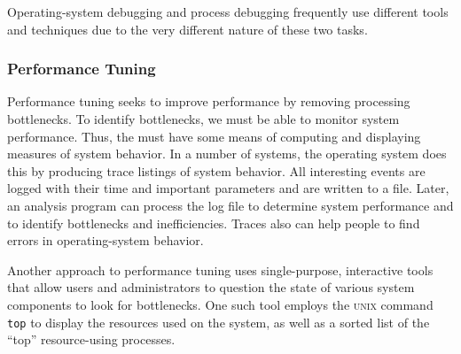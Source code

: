 Operating-system debugging and process debugging frequently use different tools and techniques due to the very different nature of these two tasks.

\subsubsection{Performance Tuning}\label{subsec:Performance_Tuning}
Performance tuning seeks to improve performance by removing processing bottlenecks.
To identify bottlenecks, we must be able to monitor system performance.
Thus, the  must have some means of computing and displaying measures of system behavior.
In a number of systems, the operating system does this by producing trace listings of system behavior.
All interesting events are logged with their time and important parameters and are written to a file.
Later, an analysis program can process the log file to determine system performance and to identify bottlenecks and inefficiencies.
Traces also can help people to find errors in operating-system behavior.

Another approach to performance tuning uses single-purpose, interactive tools that allow users and administrators to question the state of various system components to look for bottlenecks.
One such tool employs the \textsc{unix} command \texttt{top} to display the resources used on the system, as well as a sorted list of the ``top'' resource-using processes.

